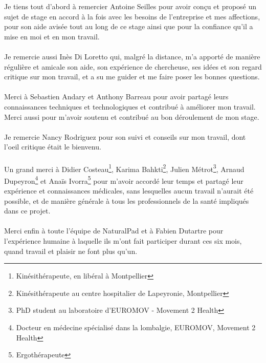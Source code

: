 Je tiens tout d'abord à remercier Antoine Seilles pour avoir conçu et proposé un sujet de stage en accord à la fois avec les besoins de l'entreprise et mes affections, pour son aide avisée tout au long de ce stage ainsi que pour la confiance qu'il a mise en moi et en mon travail.

\paragraph{}Je remercie aussi Inès Di Loretto qui, malgré la distance, m'a apporté de manière régulière et amicale son aide, son expérience de chercheuse, ses idées et son regard critique sur mon travail, et a su me guider et me faire poser les bonnes questions.

\paragraph{}Merci à Sebastien Andary et Anthony Barreau pour avoir partagé leurs connaissances techniques et technologiques et contribué à améliorer mon travail. Merci aussi pour m'avoir soutenu et contribué au bon déroulement de mon stage.

\paragraph{}Je remercie Nancy Rodriguez pour son suivi et conseils sur mon travail, dont l'oeil critique était le bienvenu.

\paragraph{}Un grand merci à Didier Costeau\footnote{Kinésithérapeute, en libéral à Montpellier}, Karima Bahkti\footnote{Kinésithérapeute au centre hospitalier de Lapeyronie, Montpellier}, Julien Métrot\footnote{PhD student au laboratoire d'EUROMOV - Movement 2 Health}, Arnaud Dupeyron\footnote{Docteur en médecine spécialisé dans la lombalgie, EUROMOV, Movement 2 Health} et Anaïs Ivorra\footnote{Ergothérapeute} pour m'avoir accordé leur temps et partagé leur expérience et connaissances médicales, sans lesquelles aucun travail n'aurait été possible, et de manière générale à tous les professionnels de la santé impliqués dans ce projet.

\paragraph{}Merci enfin à toute l'équipe de NaturalPad et à Fabien Dutartre pour l'expérience humaine à laquelle ils m'ont fait participer durant ces six mois, quand travail et plaisir ne font plus qu'un.
